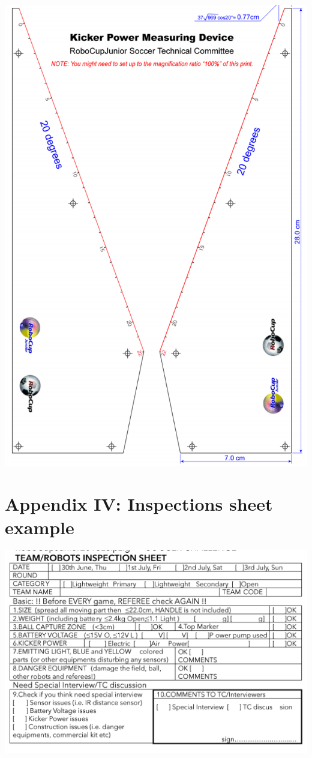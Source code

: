 \documentclass{article}
\begin{document}
\includegraphics[width=1\textwidth]{media/image9.png}

\section{Appendix IV: Inspections sheet example\label{ref-065}}

\includegraphics[width=1\textwidth]{media/image10.png}
\end{document}
